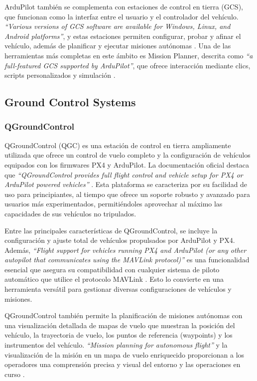     ArduPilot también se complementa con estaciones de control en tierra (GCS), que funcionan como la interfaz entre el usuario y el controlador del vehículo. \textit{“Various versions of GCS software are available for Windows, Linux, and Android platforms”}, y estas estaciones permiten configurar, probar y afinar el vehículo, además de planificar y ejecutar misiones autónomas \cite{ardupilot_docs}. Una de las herramientas más completas en este ámbito es Mission Planner, descrita como \textit{“a full-featured GCS supported by ArduPilot”}, que ofrece interacción mediante clics, scripts personalizados y simulación \cite{ardupilot_docs}.

\subsection{Ground Control Systems}
    \subsubsection{QGroundControl}
    QGroundControl (QGC) es una estación de control en tierra ampliamente utilizada que ofrece un control de vuelo completo y la configuración de vehículos equipados con los firmwares PX4 y ArduPilot. La documentación oficial destaca que \textit{“QGroundControl provides full flight control and vehicle setup for PX4 or ArduPilot powered vehicles”} \cite{qgc_docs}. Esta plataforma se caracteriza por su facilidad de uso para principiantes, al tiempo que ofrece un soporte robusto y avanzado para usuarios más experimentados, permitiéndoles aprovechar al máximo las capacidades de sus vehículos no tripulados.

    Entre las principales características de QGroundControl, se incluye la configuración y ajuste total de vehículos propulsados por ArduPilot y PX4. Además, \textit{“Flight support for vehicles running PX4 and ArduPilot (or any other autopilot that communicates using the MAVLink protocol)”} es una funcionalidad esencial que asegura su compatibilidad con cualquier sistema de piloto automático que utilice el protocolo MAVLink \cite{qgc_docs}. Esto lo convierte en una herramienta versátil para gestionar diversas configuraciones de vehículos y misiones.

    QGroundControl también permite la planificación de misiones autónomas con una visualización detallada de mapas de vuelo que muestran la posición del vehículo, la trayectoria de vuelo, los puntos de referencia (waypoints) y los instrumentos del vehículo. \textit{“Mission planning for autonomous flight”} y la visualización de la misión en un mapa de vuelo enriquecido proporcionan a los operadores una comprensión precisa y visual del entorno y las operaciones en curso \cite{qgc_docs}.

